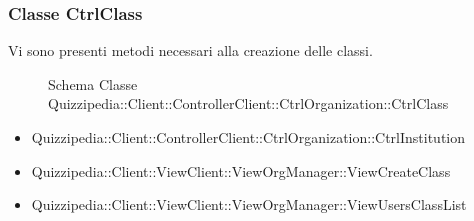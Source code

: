 \subsubsection{Classe CtrlClass}
Vi sono presenti metodi necessari alla creazione delle classi.
\begin{figure}[H]
\centering
\noindent{}
\caption{Schema Classe Quizzipedia::Client::ControllerClient::CtrlOrganization::CtrlClass}
\end{figure}
\begin{itemize}
\item Quizzipedia::Client::ControllerClient::CtrlOrganization::CtrlInstitution
\item Quizzipedia::Client::ViewClient::ViewOrgManager::ViewCreateClass
\item Quizzipedia::Client::ViewClient::ViewOrgManager::ViewUsersClassList
\end{itemize}
